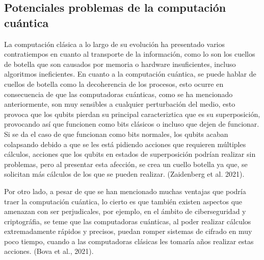 \documentclass[twoside]{article}
\begin{document}
\subsection{Potenciales problemas de la computación cuántica}

La computación clásica a lo largo de su evolución ha presentado varios contratiempos en cuanto al transporte de la información, como lo son los cuellos de botella que son causados por memoria o hardware insuficientes, incluso algoritmos ineficientes. En cuanto a la computación cuántica, se puede hablar de cuellos de botella como la decoherencia de los procesos, esto ocurre en consecuencia de que las computadoras cuánticas, como se ha mencionado anteriormente, son muy sensibles a cualquier perturbación del medio, esto provoca que los qubits pierdan su principal caracteriztica que es su superposición, provocando así que funcionen como bits clásicos o incluso que dejen de funcionar. Si se da el caso de que funcionan como bits normales, los qubits acaban colapsando debido a que se les está pidiendo acciones que requieren múltiples cálculos, acciones que los qubits en estados de superposición podrían realizar sin problemas, pero al presentar esta afección, se crea un cuello botella ya que, se solicitan más cálculos de los  que se pueden realizar. (Zaidenberg et al. 2021).

Por otro lado, a pesar de que se han mencionado muchas ventajas que podría traer la computación cuántica, lo cierto es que también existen aspectos que amenazan con ser perjudicales, por ejemplo, en el ámbito de ciberseguridad y criptográfia, se teme que las computadoras cuánticas, al poder realizar cálculos extremadamente rápidos y precisos, puedan romper sistemas de cifrado en muy poco tiempo, cuando a las computadoras clásicas les tomaría años realizar estas acciones. (Bova et al., 2021). 

\newpage
\end{document}
